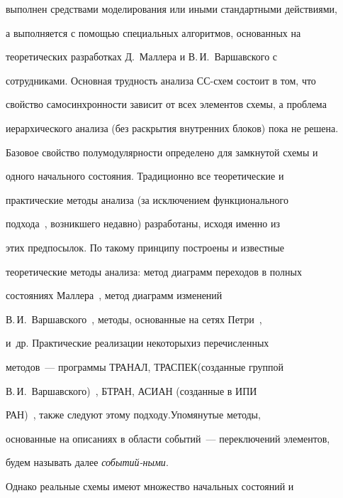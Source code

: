 выполнен средствами моделирования или иными стандартными действиями, 


а выполняется с помощью специальных алгоритмов, основанных на 


теоретических разработках Д.~Маллера и В.\,И.~Варшавского с 


сотрудниками. Основная трудность анализа СС-схем состоит в том, что 


свойство самосинхронности зависит от всех элементов схемы, а проблема 


иерархического анализа (без раскрытия внутренних блоков) по\-ка не решена.





Базовое свойство полумодулярности определено для замкнутой схемы и 


одного начального состояния. Традиционно все тео\-ре\-ти\-че\-ские и 


практические методы анализа (за исключением функционального 


подхода~\cite{5-4}, возникшего недавно) разработаны, исходя именно из 


этих предпосылок. По такому принципу построены и известные 


теоретические методы анализа: метод диаграмм переходов в полных 


состояниях Маллера~\cite{2-4}, метод диаграмм изменений 


В.\,И.~Варшавского~\cite{6-4}, методы, основанные на сетях Петри~\cite{7-4}, 


и~др. Практические реализации некоторых\linebreak из перечисленных 


методов~--- программы ТРАНАЛ, ТРАСПЕК\linebreak (созданные группой 


В.\,И.~Варшавского)~\cite{6-4}, \mbox{БТРАН}, \mbox{АСИАН} (созданные в ИПИ 


РАН)~\cite{8-4}, также следуют этому подходу.\linebreak Упомянутые методы, 


основанные на описаниях в области событий~--- переключений элементов, 


будем называть далее \textit{событий-\linebreak ными}.





Однако реальные схемы имеют множество начальных состояний и 


